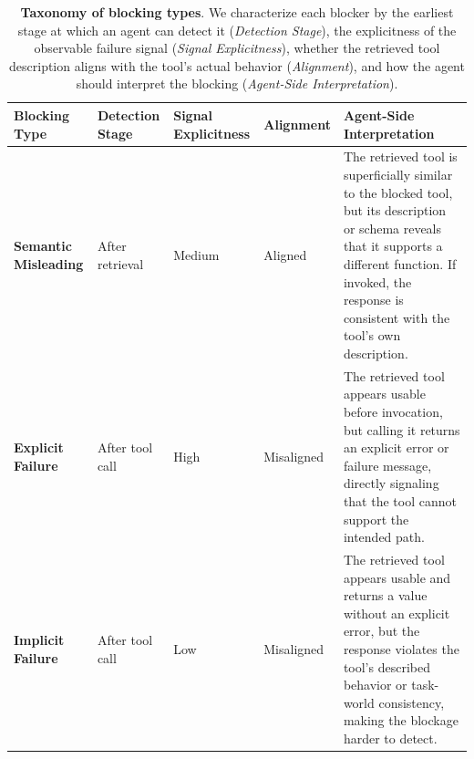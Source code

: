 \documentclass{llmxive}
\providecommand{\arraystretch}{1.15}
\begin{document}
\begin{table}[t]
\centering
\small
\setlength{\tabcolsep}{3.5pt}
\renewcommand{\arraystretch}{1.18}

\begin{tabularx}{\textwidth}{@{}
>{\arraybackslash}p{}
>{\centering\arraybackslash}p{}
>{\centering\arraybackslash}p{}
>{\centering\arraybackslash}p{}
>{\arraybackslash}X
@{}}
\toprule
\textbf{Blocking Type} &
\textbf{Detection Stage} &
\textbf{Signal Explicitness} &
\textbf{Alignment} &
\textbf{Agent-Side Interpretation} \\
\midrule

\textbf{Semantic Misleading} &
After retrieval &
Medium &
Aligned &
The retrieved tool is superficially similar to the blocked tool, but its description or schema reveals that it supports a different function. If invoked, the response is consistent with the tool's own description. \\

\textbf{Explicit Failure} &
After tool call &
High &
Misaligned &
The retrieved tool appears usable before invocation, but calling it returns an explicit error or failure message, directly signaling that the tool cannot support the intended path. \\

\textbf{Implicit Failure} &
After tool call &
Low &
Misaligned &
The retrieved tool appears usable and returns a value without an explicit error, but the response violates the tool's described behavior or task-world consistency, making the blockage harder to detect. \\

\bottomrule
\end{tabularx}

\caption{\textbf{Taxonomy of blocking types}. We characterize each blocker by the earliest stage at which an agent can detect it (\textit{Detection Stage}), the explicitness of the observable failure signal (\textit{Signal Explicitness}), whether the retrieved tool description aligns with the tool's actual behavior (\textit{Alignment}), and how the agent should interpret the blocking (\textit{Agent-Side Interpretation}).
}
\label{tab:blocking-comparison-tab}
\end{table}
\end{document}
